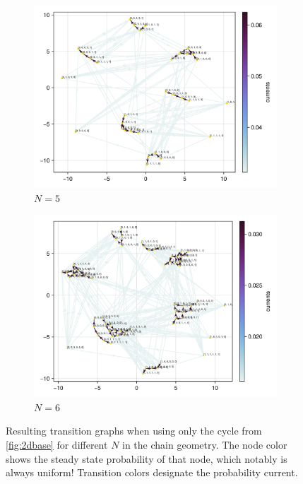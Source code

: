 \documentclass[11pt]{article}
\theoremstyle{nothm}
\begin{document}
\begin{tcolorbox}
\begin{figure}[H]
\begin{subfigure}[t]{0.49\textwidth}
        \end{subfigure}
        \begin{subfigure}[t]{0.49\textwidth}
            \centering
            \includegraphics[width=\textwidth]{../../plots/ones/cc1/spring_N=5_metadata=(chash=5795298381321907906,ctype=simple).png}
            \caption{$N=5$}
        \end{subfigure}
        \begin{subfigure}[t]{0.49\textwidth}
            \centering
            \includegraphics[width=\textwidth]{../../plots/ones/cc1/spring_N=6_metadata=(chash=5795298381321907906,ctype=simple).png}
            \caption{$N=6$}
        \end{subfigure}
        \caption{
            Resulting transition graphs when using only the cycle from \cref{fig:2dbase} for different $N$ in the chain geometry.
            The node color shows the steady state probability of that node, which notably is always uniform!
            Transition colors designate the probability current.
        }\label{fig:2dbase_graphs_c}
    \end{figure}
\end{tcolorbox}
\end{document}
